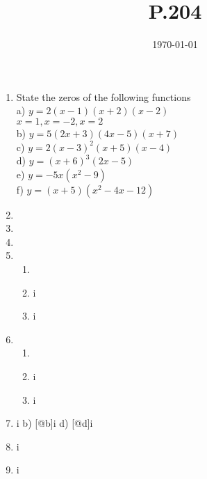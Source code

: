 \documentclass[11pt]{article}
\date{\today}
\title{P.204}
\begin{document}
\maketitle
\tableofcontents

\begin{enumerate}
\item State the zeros of the following functions\\
a) 
\(y=2(x-1)(x+2)(x-2)\)\\
\(x=1, x=-2, x=2\)\\
b) \(y=5(2x+3)(4x-5)(x+7)\)\\
c) \(y=2(x-3)^2(x+5)(x-4)\)\\
d) \(y=(x+6)^3(2x-5)\)\\
e) \(y=-5x(x^2-9)\)\\
f) \(y=(x+5)(x^2-4x-12)\)\\
\item 

\item 

\item 

\setcounter{enumi}{5}
\item \begin{enumerate}
\item 

\setcounter{enumii}{2}
\item i
\setcounter{enumii}{4}
\item i
\end{enumerate}
\item \begin{enumerate}
\item 

\setcounter{enumii}{2}
\item i
\setcounter{enumii}{4}
\item i
\end{enumerate}
\setcounter{enumi}{8}
\item i
b) [@b]i
d) [@d]i
\setcounter{enumi}{10}
\item i
\setcounter{enumi}{13}
\item i
\end{enumerate}
\end{document}
